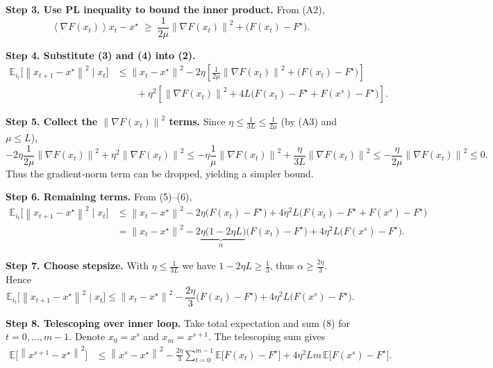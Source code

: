 \documentclass{article}
\newcommand{\E}{\mathbb{E}}
\newcommand{\norm}[1]{\left\lVert #1\right\rVert}
\newcommand{\inner}[1]{\left\langle #1\right\rangle}
\newcommand{\grad}{\nabla}
\begin{document}
\noindent\textbf{Step 3. Use PL inequality to bound the inner product.}  
From (A2),
\[
\inner{\grad F(x_t)}{x_t-x^{\star}}
\;\ge\;
\frac{1}{2\mu}\norm{\grad F(x_t)}^{2}
    +\bigl(F(x_t)-F^{\star}\bigr).                         \tag{4}
\]

\noindent\textbf{Step 4. Substitute (3) and (4) into (2).}  
\[
\begin{aligned}
\E_{i_t}\!\bigl[\norm{x_{t+1}-x^{\star}}^{2}\mid x_t\bigr]
&\le \norm{x_t-x^{\star}}^{2}
-2\eta\!\left[\frac{1}{2\mu}\norm{\grad F(x_t)}^{2}
                +\bigl(F(x_t)-F^{\star}\bigr)\right]    \\
&\qquad
+\eta^{2}\!\left[\norm{\grad F(x_t)}^{2}
   +4L\bigl(F(x_t)-F^{\star}+F(x^{s})-F^{\star}\bigr)\right]. \tag{5}
\end{aligned}
\]

\noindent\textbf{Step 5. Collect the $\norm{\grad F(x_t)}^{2}$ terms.}  
Since $\eta\le \frac{1}{3L}\le\frac{1}{2\mu}$ (by (A3) and $\mu\le L$),
\[
-2\eta\frac{1}{2\mu}\norm{\grad F(x_t)}^{2}
+\eta^{2}\norm{\grad F(x_t)}^{2}
\le -\eta\frac{1}{\mu}\norm{\grad F(x_t)}^{2}
+\frac{\eta}{3L}\norm{\grad F(x_t)}^{2}
\le -\frac{\eta}{2\mu}\norm{\grad F(x_t)}^{2}\le 0.          \tag{6}
\]
Thus the gradient‑norm term can be dropped, yielding a simpler bound.

\noindent\textbf{Step 6. Remaining terms.}  
From (5)–(6),
\[
\begin{aligned}
\E_{i_t}\!\bigl[\norm{x_{t+1}-x^{\star}}^{2}\mid x_t\bigr]
&\le \norm{x_t-x^{\star}}^{2}
-2\eta\bigl(F(x_t)-F^{\star}\bigr)
+4\eta^{2}L\bigl(F(x_t)-F^{\star}+F(x^{s})-F^{\star}\bigr) \\
&= \norm{x_t-x^{\star}}^{2}
-\underbrace{2\eta\bigl(1-2\eta L\bigr)}_{\alpha}
\bigl(F(x_t)-F^{\star}\bigr)
+4\eta^{2}L\bigl(F(x^{s})-F^{\star}\bigr).                \tag{7}
\end{aligned}
\]

\noindent\textbf{Step 7. Choose stepsize.}  
With $\eta\le\frac{1}{3L}$ we have $1-2\eta L\ge\frac13$, thus
$\alpha\ge \frac{2\eta}{3}$.
Hence
\[
\E_{i_t}\!\bigl[\norm{x_{t+1}-x^{\star}}^{2}\mid x_t\bigr]
\le \norm{x_t-x^{\star}}^{2}
-\frac{2\eta}{3}\bigl(F(x_t)-F^{\star}\bigr)
+4\eta^{2}L\bigl(F(x^{s})-F^{\star}\bigr).                \tag{8}
\]

\noindent\textbf{Step 8. Telescoping over inner loop.}  
Take total expectation and sum (8) for $t=0,\dots,m-1$.
Denote $x_0=x^{s}$ and $x_m=x^{s+1}$.  The telescoping sum gives
\[
\begin{aligned}
\E\!\bigl[\norm{x^{s+1}-x^{\star}}^{2}\bigr]
&\le \norm{x^{s}-x^{\star}}^{2}
-\frac{2\eta}{3}\sum_{t=0}^{m-1}\E\!\bigl[F(x_t)-F^{\star}\bigr]
+4\eta^{2}L m\,\E\!\bigl[F(x^{s})-F^{\star}\bigr].         \tag{9}
\end{aligned}
\]
\end{document}
